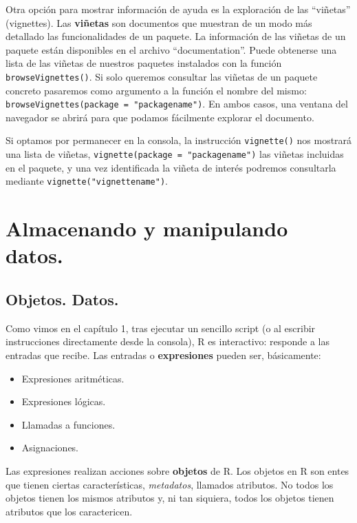 \documentclass[
]{book}
\begin{document}
Otra opción para mostrar información de ayuda es la exploración de las ``viñetas'' (vignettes). Las \textbf{viñetas} son documentos que muestran de un modo más detallado las funcionalidades de un paquete. La información de las viñetas de un paquete están disponibles en el archivo ``documentation''. Puede obtenerse una lista de las viñetas de nuestros paquetes instalados con la función \texttt{browseVignettes()}. Si solo queremos consultar las viñetas de un paquete concreto pasaremos como argumento a la función el nombre del mismo: \texttt{browseVignettes(package\ =\ "packagename")}. En ambos casos, una ventana del navegador se abrirá para que podamos fácilmente explorar el documento.

Si optamos por permanecer en la consola, la instrucción \texttt{vignette()} nos mostrará una lista de viñetas, \texttt{vignette(package\ =\ "packagename")} las viñetas incluidas en el paquete, y una vez identificada la viñeta de interés podremos consultarla mediante \texttt{vignette("vignettename")}.

\chapter{Almacenando y manipulando datos.}\label{almacenando-y-manipulando-datos.}

\section{Objetos. Datos.}\label{objetos.-datos.}

Como vimos en el capítulo 1, tras ejecutar un sencillo script (o al escribir instrucciones directamente desde la consola), R es interactivo: responde a las entradas que recibe. Las entradas o \textbf{expresiones} pueden ser, básicamente:

\begin{itemize}
\item
  Expresiones aritméticas.
\item
  Expresiones lógicas.
\item
  Llamadas a funciones.
\item
  Asignaciones.
\end{itemize}

Las expresiones realizan acciones sobre \textbf{objetos} de R. Los objetos en R son entes que tienen ciertas características, \emph{metadatos}, llamados atributos. No todos los objetos tienen los mismos atributos y, ni tan siquiera, todos los objetos tienen atributos que los caractericen.
\end{document}
